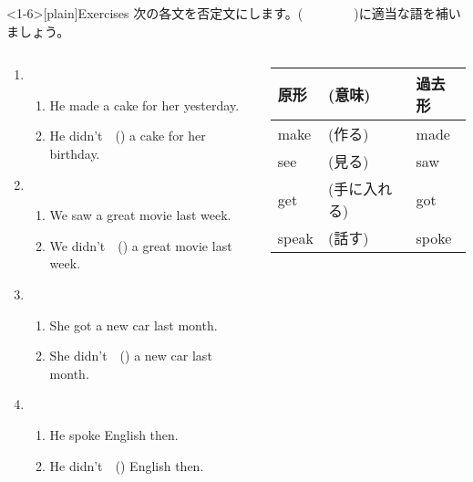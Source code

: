 \documentclass[aspectratio=169,xcolor={dvipsnames,table}]{beamer}
\newcommand{\myaudio}[1]{\href{#1}{\faVolumeUp}}
\begin{document}
\begin{frame}<1-6>[plain]{Exercises}
 次の各文を否定文にします。(~~~~~~~~)に適当な語を補いましょう。

\begin{columns}
\begin{column}{.6\textwidth}
\begin{enumerate}
 \item \begin{enumerate}
	\item He made a cake for her yesterday.
	\item He didn't~~() a cake for her birthday.
       \end{enumerate}
 \item \begin{enumerate}
	\item We saw a great movie last week.
	\item We didn't~~() a great movie last week.
       \end{enumerate}
 \item \begin{enumerate}
	\item She got a new car last month.
	\item She didn't~~() a new car last month.
       \end{enumerate}
 \item \begin{enumerate}
	\item He spoke English then.
	\item He didn't~~() English then.
       \end{enumerate}
\end{enumerate}
\end{column}
\begin{column}{.35\textwidth}
{
\begin{tabular}{lll}\toprule
{\small 原形}&{\small (意味)}&{\small 過去形}\\\midrule
{make}&{{\small (作る)}}&{made}\\
{see}&{{\small (見る)}}&{saw}\\
{get}&{{\small (手に入れる)}}&{got}\\
{speak}&{{\small(話す)}}&{spoke}\\
\bottomrule
\end{tabular}}%

\end{column}
\end{columns}
\hfill\myaudio{./audio/026_past_didnot_07.mp3}

\end{frame}
\end{document}

